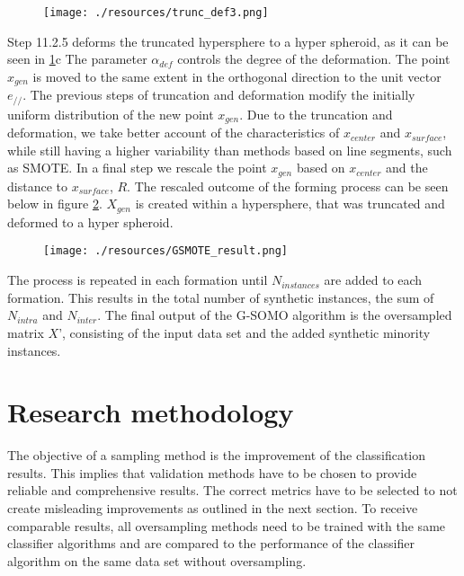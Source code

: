 \documentclass[parskip=full]{scrartcl}
\begin{document}
\begin{figure}[H]
	\centering
	\texttt{[image: ./resources/trunc\_def3.png]}
	\label{fig:Hypersphere}
\end{figure}

Step 11.2.5 deforms the truncated hypersphere to a hyper spheroid, as it can be
seen in \ref{fig:Hypersphere}c The parameter $\alpha_{def}$ controls the degree
of the deformation. The point $x_{gen}$ is moved to the same extent in the
orthogonal direction to the unit vector $e_{//}$. The previous steps of
truncation and deformation modify the initially uniform distribution of the new
point $x_{gen}$. Due to the truncation and deformation, we take better account
of the characteristics of $x_{center}$ and $x_{surface}$, while still having a
higher variability than methods based on line segments, such as SMOTE. In a
final step we rescale the point $x_{gen}$ based on $x_{center}$ and the distance
to $x_{surface}$, $R$. The rescaled outcome of the forming process can be seen
below in figure \ref{fig:GeometricConstruction}. $X_{gen}$ is created within a
hypersphere, that was truncated and deformed to a hyper spheroid.

\begin{figure}[H]
	\centering
	\texttt{[image: ./resources/GSMOTE\_result.png]}
	\label{fig:GeometricConstruction}
\end{figure}

The process is repeated in each formation until $N_{instances}$ are added to
each formation. This results in the total number of synthetic instances, the sum
of $N_{intra}$ and $N_{inter}$. The final output of the G-SOMO algorithm is the
oversampled matrix $X$', consisting of the input data set and the added
synthetic minority instances.

\section{Research methodology}

The objective of a sampling method is the improvement of the classification
results. This implies that validation methods have to be chosen to provide
reliable and comprehensive results. The correct metrics have to be selected to
not create misleading improvements as outlined in the next section. To receive
comparable results, all oversampling methods need to be trained with the same
classifier algorithms and are compared to the performance of the classifier
algorithm on the same data set without oversampling.
\end{document}
